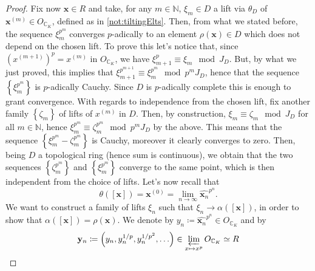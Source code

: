 \begin{proof}
	Fix now $\mathbf{x} \in R$ and take, for any $m \in \mathbb{N}$, 
	$\xi_m \in D$ a lift via $\theta_D$ of $\mathbf{x}^{(m)} \in O_{\mathbb{C}_K}$, defined
	as in \cref{not:tiltingElts}.
	Then, from what we stated before, the sequence $\xi_m^{p^m}$ converges
	$p$-adically to an element $\rho(\mathbf{x}) \in D$ which does not depend on the chosen lift.
	To prove this let's notice that, since $(x^{(m+1)})^p = x^{(m)}$ in $O_{\mathbb{C}_K}$,
	we have $\xi_{m+1}^p \equiv \xi_m \mod J_D$.
	But, by what we just proved, this implies that $\xi_{m+1}^{p^{m+1}} \equiv \xi_{m}^{p^m}
	\mod p^m J_D$, hence that the sequence $\left\{ \xi_m^{p^m} \right\}$
	is $p$-adically Cauchy.
	Since $D$ is $p$-adically complete this is enough to grant convergence.
	With regards to independence from the chosen lift, fix another family 
	$\left\{ \zeta_m \right\}$ of lifts of $x^{(m)}$ in $D$.
	Then, by construction, $\xi_m \equiv \zeta_m \mod J_D$ for all $m \in \mathbb{N}$, hence
	$\xi_m^{p^m} \equiv \zeta_{m}^{p^m} \mod p^m J_D$ by the above.
	This means that the sequence $\left\{ \xi_m^{p^m} - \zeta_m^{p^m} \right\}$
	is Cauchy, moreover it clearly converges to zero.
	Then, being $D$ a topological ring (hence sum is continuous),
	we obtain that the two sequences $\left\{ \zeta_m^{p^m} \right\}$ and
	$\left\{ \xi_m^{p^m} \right\}$ converge to the same point,
	which is then independent from the choice of lifts.
	Let's now recall that
	\begin{equation*}
	\theta([\mathbf{x}]) = \mathbf{x}^{(0)} =
	\lim_{n \to \infty} \widehat{\mathbf{x}_n}^{p^n}
	.\end{equation*}
	We want to construct a family of lifts
	$\xi_n$ such that $\xi_n \to \alpha([\mathbf{x}])$, in order
	to show that $\alpha([\mathbf{x}]) = \rho(\mathbf{x})$.
	We denote by $y_n \coloneqq \widehat{\mathbf{x}_n}^{p^n} \in O_{\mathbb{C}_K}$
	and by
	\begin{equation*}
		\mathbf{y}_n \coloneqq \left( y_n, y_n^{1/p}, y_n^{1/p^2}, \ldots \right) \in 
		\varprojlim_{x \mapsto x^p} O_{\mathbb{C}_K} \simeq R

\end{equation*}
\end{proof}
